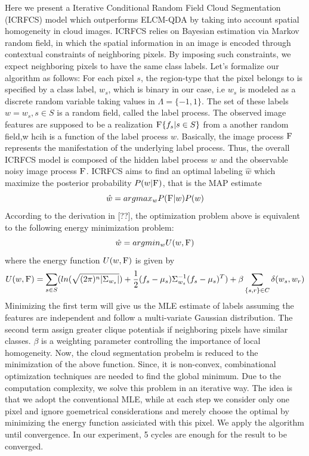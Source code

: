 \documentclass[english]{article}\usepackage{graphicx, color}
\numberwithin{equation}{section}
\numberwithin{figure}{section}
\begin{document}
Here we present a Iterative Conditional Random Field Cloud Segmentation (ICRFCS) model which outperforms ELCM-QDA by taking into account spatial homogeneity in cloud images. ICRFCS relies on Bayesian estimation via Markov random field, in which the spatial information in an image is encoded through contextual constraints of neighboring pixels. By imposing such constraints, we expect neighboring pixels to have the same class labels. Let's formalize our algorithm as follows: For each pixel $s$, the region-type that the pixel belongs to is specified by a class label, $w_s$, which is binary in our case, i.e $w_s$ is modeled as a discrete random variable taking values in $\Lambda=\{-1,1\}$. The set of these labels $w={w_s, s\in S}$ is a random field, called the label process. The observed image features are supposed to be a realization $\textsc{F}\{f_s|s\in S\}$ from a another random field,w hcih is a function of the label process $w$. Basically, the image process $\textsc{F}$ represents the manifestation of the underlying label process. Thus, the overall ICRFCS model is composed of the hidden label process $w$ and the observable noisy image process $\textsc{F}$. ICRFCS aims to find an optimal labeling $\hat{w}$ which maximize the posterior probability $P(w|\textsc{F})$, that is the MAP estimate
\begin{equation}
\hat{w}= arg max_{w} P(\textsc{F}|w) P(w)
\end{equation}
According to the derivation in [??], the optimization problem above is equivalent to the following energy minimization problem:
\begin{equation}
\hat{w} = arg min_w U(w, \textsc{F})
\end{equation}
where the energy function $U(w, \textsc{F})$ is given by
\begin{equation}
U(w, \textsc{F}) = \sum_{s\in S} (ln(\sqrt{(2\pi)^n|\Sigma_{w_s}|}) + \frac{1}{2}(f_s-\mu_s)\Sigma_{w_s}^{-1}(f_s-\mu_s)^T) + \beta \sum_{\{s,r\}\in C} \delta(w_s, w_r)
\end{equation}
Minimizing the first term will give us the MLE estimate of labels assuming the features are independent and follow a multi-variate Gaussian distribution. The second term assign greater clique potentials if neighboring pixels have similar classes. $\beta$ is a weighting parameter controlling the importance of local homogeneity. Now, the cloud segmentation probelm is reduced to the minimization of the above function. Since, it is non-convex, combinational optimization techniques are needed to find the global minimum. Due to the computation complexity, we solve this problem in an iterative way. The idea is that we adopt the conventional MLE, while at each step we consider only one pixel and ignore goemetrical considerations and merely choose the optimal by minimizing the energy function assiciated with this pixel. We apply the algorithm until convergence. In our experiment, 5 cycles are enough for the result to be converged.
\end{document}
